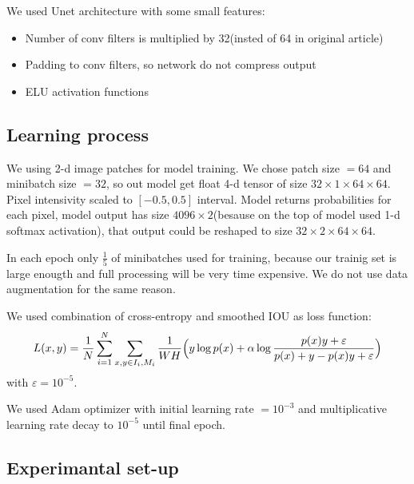 \documentclass[review]{elsarticle}
\begin{document}
We used Unet architecture  with some small features: 
\begin{itemize}
	\item Number of conv filters is multiplied by 32(insted of 64 in original article)
	\item Padding to conv filters, so network do not compress output
	\item ELU activation functions
	
\end{itemize}

\subsection{Learning process}

We using 2-d image patches for model training. We chose patch size $=64$ and minibatch size $=32$, so out model get 
float 4-d tensor of size $32 \times 1 \times 64 \times 64$.
Pixel intensivity scaled to $[-0.5, 0.5]$ interval.
Model returns probabilities for each pixel, model output has 
size $4096 \times 2$(besause on the top of model used 
1-d softmax activation), that output could be reshaped to size $32 \times 2 \times 64 \times 64$.

In each epoch only $\frac{1}{5}$ of minibatches used for training, because our trainig set is large enougth and full processing will be
very time expensive. We do not use data augmentation for the same reason.
    
We used combination of cross-entropy and smoothed IOU as loss function:
\begin{equation}{\label{Loss}}
	L(x, y) = \frac{1}{N} 
		\sum \limits_{i = 1}^{N} 
		\sum \limits_{x, y \in I_{i}, M_{i}} 
		\frac{1}{W H} \Bigl( 
		y \log p(x) 
		+ \alpha \log 
		\frac{p(x) y + \varepsilon}{p(x) + y - p(x)y + \varepsilon}
		\Bigr)
\end{equation}
with $\varepsilon=10^{-5}$.

We used Adam optimizer with initial learning rate $=10^{-3}$ and 
multiplicative learning rate decay to $10^{-5}$ until final epoch.

\subsection{Experimantal set-up}
\end{document}
